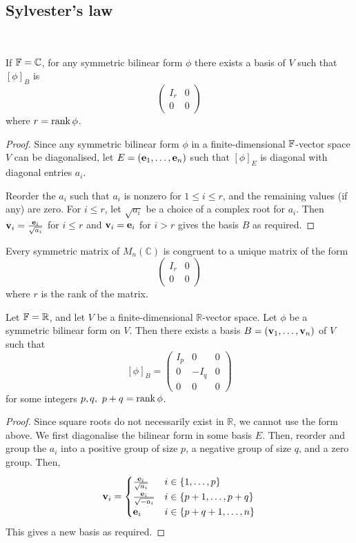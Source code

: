 \documentclass[a4paper,11pt]{article}
\begin{document}
\subsection{Sylvester's law}
\ \vspace*{-1.5em}
\begin{corollary}
	If \( {\mathbb{F}} = \mathbb C \), for any symmetric bilinear form \( \phi \) there exists a basis of \( V \) such that \( [\phi]_B \) is
	\[
		\begin{pmatrix}
			I_r & 0 \\
			0   & 0
		\end{pmatrix}
	\]
	where $ r = \rank \phi $. 
\end{corollary}
\begin{proof}
	Since any symmetric bilinear form \( \phi \) in a finite-dimensional \( {\mathbb{F}} \)-vector space \( V \) can be diagonalised, let \( E = ({\bf e}_1, \dots, {\bf e}_n) \) such that \( [\phi]_E \) is diagonal with diagonal entries \( a_i \).

	Reorder the \( a_i \) such that \( a_i \) is nonzero for \( 1 \leq i \leq r \), and the remaining values (if any) are zero.
	For \( i \leq r \), let \( \sqrt{a_i} \) be a choice of a complex root for \( a_i \).
	Then \( {\bf v}_i = \frac{{\bf e}_i}{\sqrt{a_i}} \) for \( i \leq r \) and \( {\bf v}_i = {\bf e}_i \) for \( i > r \) gives the basis \( B \) as required.
\end{proof}
\begin{corollary}
	Every symmetric matrix of \( M_n(\mathbb C) \) is congruent to a unique matrix of the form
	\[
		\begin{pmatrix}
			I_r & 0 \\
			0   & 0
		\end{pmatrix}
	\]
	where \( r \) is the rank of the matrix.
\end{corollary}
\begin{corollary}
	Let \( {\mathbb{F}} = \mathbb R \), and let \( V \) be a finite-dimensional \( \mathbb R \)-vector space.
	Let \( \phi \) be a symmetric bilinear form on \( V \).
	Then there exists a basis \( B = ({\bf v}_1, \dots, {\bf v}_n) \) of \( V \) such that
	\[
		[\phi]_B = \begin{pmatrix}
			I_p & 0    & 0 \\
			0   & -I_q & 0 \\
			0   & 0    & 0
		\end{pmatrix}
	\]
	for some integers \( p, q ,\ p+q = \rank \phi\).
\end{corollary}
\begin{proof}
	Since square roots do not necessarily exist in \( \mathbb R \), we cannot use the form above.
	We first diagonalise the bilinear form in some basis \( E \).
	Then, reorder and group the \( a_i \) into a positive group of size \( p \), a negative group of size \( q \), and a zero group.
	Then,
	\[
		{\bf v}_i = \begin{cases}
			\frac{{\bf e}_i}{\sqrt{a_i}}  & i \in \qty{1, \dots, p}     \\
			\frac{{\bf e}_i}{\sqrt{-a_i}} & i \in \qty{p+1, \dots, p+q} \\
			{\bf e}_i                     & i \in \qty{p+q+1, \dots, n}
		\end{cases}
	\]
	This gives a new basis as required.
\end{proof}
\end{document}
